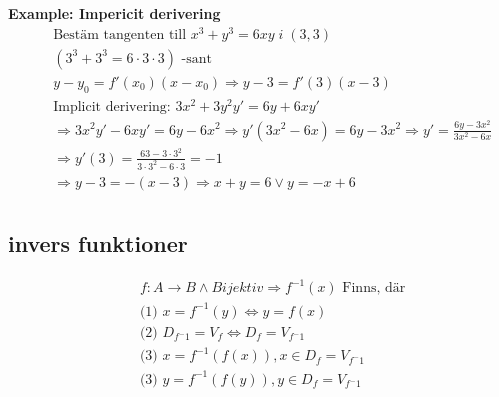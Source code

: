 \textbf{Example: Impericit derivering}
\begin{align*}
  &\quad  \text{Bestäm tangenten till } x^3+y^3=6xy \; i \; (3,3) \\
  &\quad  (3^3+3^3=6\cdot3\cdot3) \text{ -sant} \\
  &\quad  y-y_0=f'(x_0)(x-x_0) \Rightarrow y-3=f'(3)(x-3) \\
  &\quad  \text{Implicit derivering: } 3x^2+3y^2y'=6y+6xy' \\
  &\quad  \Rightarrow 3x^2y'-6xy'=6y-6x^2
  \Rightarrow y'(3x^2-6x)=6y-3x^2
  \Rightarrow y'=\frac{6y-3x^2}{3x^2-6x} \\
  &\quad \Rightarrow y'(3)=\frac{63-3\cdot3^2}{3\cdot3^2-6\cdot3}=-1 \\
  &\quad \Rightarrow y-3=-(x-3) \Rightarrow x+y=6 \lor y=-x+6 \\
\end{align*}


\subsection{invers funktioner} 
\begin{align*}
  &\quad  f: A \to B \land Bijektiv \Rightarrow f^{-1}(x) \text{ Finns, där}  \\
  &\quad \text{(1) }  x = f^{-1}(y) \Leftrightarrow y = f(x) \\
  &\quad \text{(2) }  D_{f^-1} = V_f \Leftrightarrow D_f = V_{f^-1} \\
  &\quad \text{(3) }  x = f^{-1}(f(x)), x \in D_f = V_{f^-1} \\ 
  &\quad \text{(3) }  y = f^{-1}(f(y)), y \in D_f = V_{f^-1} \\ 
\end{align*}


